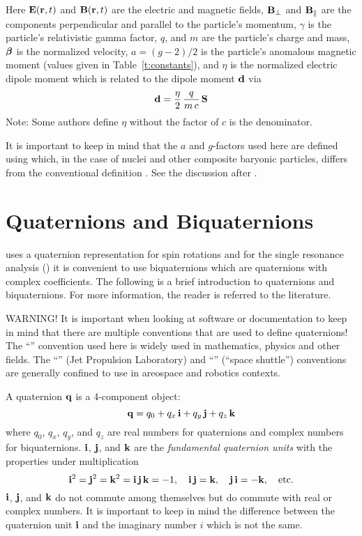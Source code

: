 Here ${\bf E} ({\bf r} ,t)$ and ${\bf B} ({\bf r} ,t)$ are the electric and magnetic fields, ${\bf B}_\perp$
and ${\bf B}_\parallel$ are the components perpendicular and parallel to the particle's momentum,
$\gamma$ is the particle's relativistic gamma factor, $q$, and $m$ are the particle's charge and
mass, $\boldsymbol{\beta}$ is the normalized velocity, $a = (g-2)/2$ is the particle's anomalous magnetic
moment (values given in Table~\ref{t:constants}), and $\eta$ is the normalized electric dipole
moment which is related to the dipole moment ${\bf d}$ via
\begin{equation}
  {\bf d} = \frac{\eta}{2} \, \frac{q}{m \, c} \, {\bf S}
\end{equation}
Note: Some authors define $\eta$ without the factor of $c$ is the denominator.

It is important to keep in mind that the $a$ and $g$-factors used here are defined using 
which, in the case of nuclei and other composite baryonic particles, differs from the conventional
definition . See the discussion after .

\section{Quaternions and Biquaternions}
\label{s:quat}

\bmad uses a quaternion representation for spin rotations\cite{b:quat} and for the single resonance
analysis () it is convenient to use biquaternions which are quaternions with
complex coefficients. The following is a brief introduction to quaternions and biquaternions. For
more information, the reader is referred to the literature\cite{b:biquat}.

WARNING! It is important when looking at software or documentation to keep in mind that there are
multiple conventions that are used to define quaternions! The ``'' convention used here
is widely used in mathematics, physics and other fields. The ``'' (Jet Propulsion
Laboratory) and ``'' (``space shuttle'') conventions are generally confined to use in
areospace and robotics contexts\cite{b:yazell,b:sommer}.

A quaternion ${\bf q}$ is a 4-component object:
\begin{equation}
  {\bf q} = q_0 + q_x \, {\bf i} + q_y \, {\bf j} + q_z \, {\bf k}
  \label{qqqqq}
\end{equation}
where $q_0$, $q_x$, $q_y$, and $q_z$ are real numbers for quaternions and complex numbers for
biquaternions. ${\bf i}$, ${\bf j}$, and ${\bf k}$ are the {\em fundamental quaternion units} with the
properties under multiplication
\begin{equation}
  {\bf i}^2 = {\bf j}^2 = {\bf k}^2 = {\bf i} \, {\bf j} \, {\bf k} = -1, \quad 
  {\bf i} \, {\bf j} = {\bf k}, \quad {\bf j} \, {\bf i} = -{\bf k}, \quad \text{etc.}
\end{equation}
${\bf i}$, ${\bf j}$, and ${\bf k}$ do not commute among themselves but do commute with real or complex
numbers. It is important to keep in mind the difference between the quaternion unit ${\bf i}$
and the imaginary number $i$ which is not the same.

